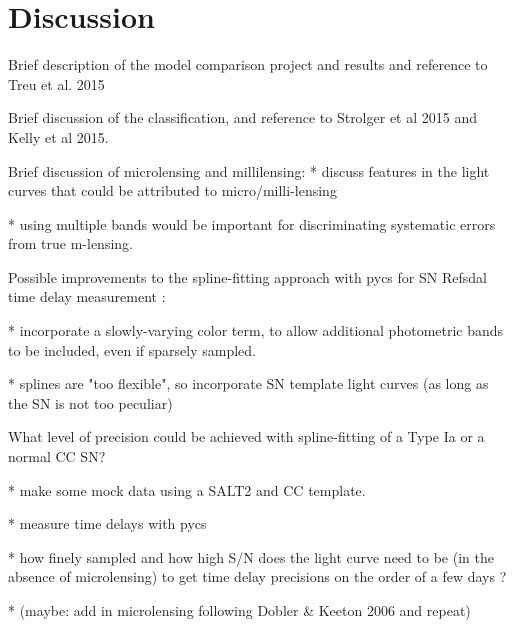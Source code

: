 \section{Discussion}\label{sec:Discussion}

Brief description of the model comparison project and results and reference to Treu et al. 2015

Brief discussion of the classification, and reference to Strolger et al 2015 and Kelly et al 2015.

Brief discussion of microlensing and millilensing: 
* discuss features in the light curves that could be attributed to micro/milli-lensing

* using multiple bands would be important for discriminating systematic errors from true m-lensing. 

Possible improvements to the spline-fitting approach with pycs for SN Refsdal time delay measurement :

* incorporate a slowly-varying color term, to allow additional photometric bands to be included, even if sparsely sampled. 

* splines are "too flexible", so incorporate SN template light curves (as long as the SN is not too peculiar)

What level of precision could be achieved with spline-fitting of a Type Ia or a normal CC SN? 

  * make some mock data using a SALT2 and CC template.

  * measure time delays with pycs

  * how finely sampled and how high S/N does the light curve need to be (in the absence of microlensing) to get time delay precisions on the order of a few days ?

  * (maybe: add in microlensing following Dobler & Keeton 2006 and repeat) 




